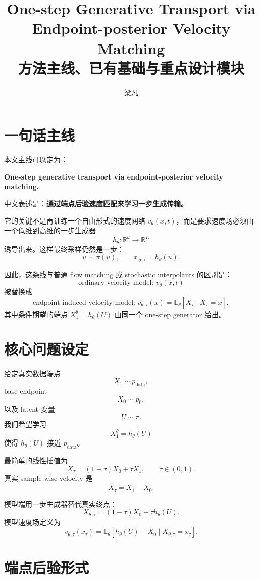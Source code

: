 \documentclass[UTF8,11pt]{ctexart}
\title{One-step Generative Transport via Endpoint-posterior Velocity Matching\\
\large 方法主线、已有基础与重点设计模块}
\author{梁凡}
\newcommand{\E}{\mathbb{E}}
\newcommand{\R}{\mathbb{R}}
\begin{document}
\maketitle

\section{一句话主线}

本文主线可以定为：
\begin{center}
\begin{minipage}{0.88\linewidth}
\centering
\textbf{One-step generative transport via endpoint-posterior velocity matching.}
\end{minipage}
\end{center}

中文表述是：\textbf{通过端点后验速度匹配来学习一步生成传输。}

它的关键不是再训练一个自由形式的速度网络 \(v_\theta(x,t)\)，而是要求速度场必须由一个低维到高维的一步生成器
\[
h_\theta:\R^d\to\R^D
\]
诱导出来。这样最终采样仍然是一步：
\[
u\sim\pi(u),\qquad x_{\mathrm{gen}}=h_\theta(u).
\]

因此，这条线与普通 flow matching 或 stochastic interpolants 的区别是：
\[
\text{ordinary velocity model: }v_\theta(x,t)
\]
被替换成
\[
\text{endpoint-induced velocity model: }
v_{\theta,\tau}(x)
=
\E_\theta[\dot X_\tau\mid X_\tau=x],
\]
其中条件期望的端点 \(X_1^\theta=h_\theta(U)\) 由同一个 one-step generator 给出。

\section{核心问题设定}

给定真实数据端点
\[
X_1\sim p_{\mathrm{data}},
\]
base endpoint
\[
X_0\sim p_0,
\]
以及 latent 变量
\[
U\sim\pi.
\]
我们希望学习
\[
X_1^\theta=h_\theta(U)
\]
使得 \(h_\theta(U)\) 接近 \(p_{\mathrm{data}}\)。

最简单的线性插值为
\[
X_\tau=(1-\tau)X_0+\tau X_1,\qquad \tau\in(0,1).
\]
真实 sample-wise velocity 是
\[
\dot X_\tau=X_1-X_0.
\]

模型端用一步生成器替代真实终点：
\[
X_{\theta,\tau}=(1-\tau)X_0+\tau h_\theta(U).
\]
模型速度场定义为
\[
v_{\theta,\tau}(x_\tau)
=
\E_\theta[h_\theta(U)-X_0\mid X_{\theta,\tau}=x_\tau].
\]

\section{端点后验形式}
\end{document}

